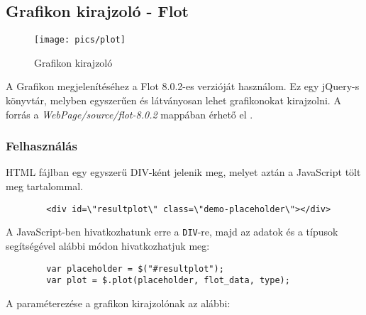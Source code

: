 \subsection{Grafikon kirajzoló - Flot \label{subsec:flot}}

	\begin{figure}[h]
	\texttt{[image: pics/plot]}
	\centering
	\caption{Grafikon kirajzoló\label{fig:plot}}
	\end{figure}
	
	A Grafikon megjelenítéséhez a Flot 8.0.2-es verzióját használom. Ez egy jQuery-s könyvtár, melyben egyszerűen és látványosan lehet grafikonokat kirajzolni. A forrás a \textit{WebPage/source/flot-8.0.2} mappában érhető el \cite{flotcharts}.
	\subsubsection{Felhasználás}
	HTML fájlban egy egyszerű DIV-ként jelenik meg, melyet aztán a JavaScript tölt meg tartalommal.
	\begin{verbatim}
		<div id=\"resultplot\" class=\"demo-placeholder\"></div>
	\end{verbatim}
	A JavaScript-ben hivatkozhatunk erre a \texttt{DIV}-re, majd az adatok és a típusok segítségével alábbi módon hivatkozhatjuk meg: 
	\begin{verbatim}
		var placeholder = $("#resultplot");
		var plot = $.plot(placeholder, flot_data, type);
	\end{verbatim}
	A paraméterezése a grafikon kirajzolónak az alábbi: 
